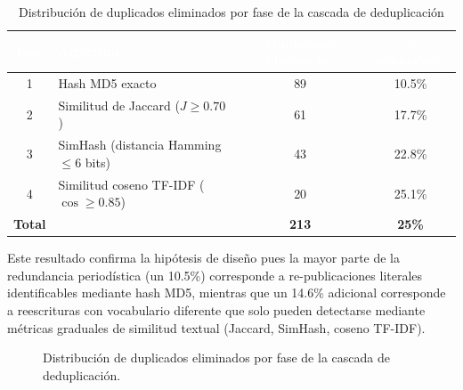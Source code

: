 \vspace{0.5cm}
\begin{table}[htbp]
\centering
\caption{Distribución de duplicados eliminados por fase de la cascada de deduplicación}
\label{tab:res_dedup}
\renewcommand{\arraystretch}{1.3}
\begin{tabular}{|c|p{4.5cm}|c|c|}
\hline
\rowcolor{black}
\textcolor{white}{\textbf{Fase}} &
\textcolor{white}{\textbf{Algoritmo}} &
\textcolor{white}{\textbf{Duplicados eliminados}} &
\textcolor{white}{\textbf{\% acumulado}} \\
\hline
1 & Hash MD5 exacto & 89 & 10.5\% \\
\hline
2 & Similitud de Jaccard ($J \geq 0.70$) & 61 & 17.7\% \\
\hline
3 & SimHash (distancia Hamming $\leq 6$ bits) & 43 & 22.8\% \\
\hline
4 & Similitud coseno TF-IDF ($\cos \geq 0.85$) & 20 & 25.1\% \\
\hline
\textbf{Total} & & \textbf{213} & \textbf{25\%} \\
\hline
\end{tabular}
\end{table}
\vspace{0.4cm}

Este resultado confirma la hipótesis de diseño pues la mayor parte de la redundancia periodística
(un 10.5\%) corresponde a re-publicaciones literales identificables mediante hash MD5, mientras
que un 14.6\% adicional corresponde a reescrituras con vocabulario diferente que solo pueden
detectarse mediante métricas graduales de similitud textual (Jaccard, SimHash, coseno TF-IDF).

\vspace{0.5cm}
\begin{figure}[htbp]
\centering
{}
\caption{Distribución de duplicados eliminados por fase de la cascada de deduplicación.}
\label{fig:grafica_dedup}
\end{figure}
\vspace{0.8cm} 

